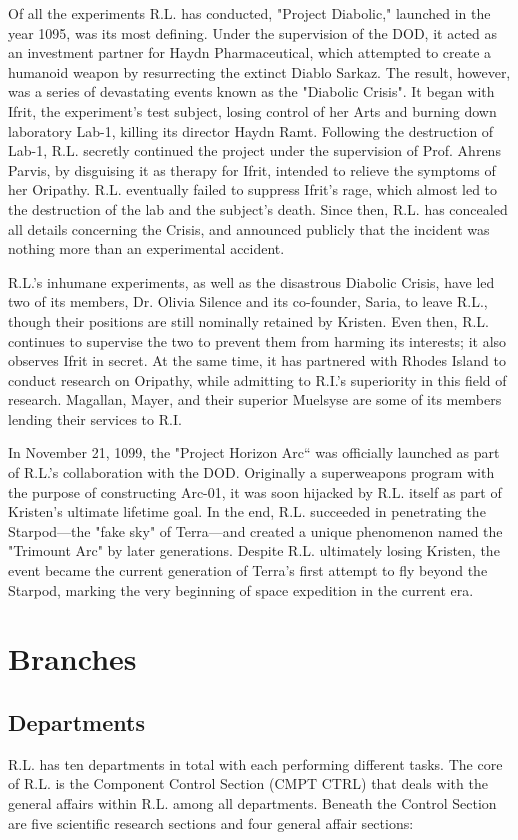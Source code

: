 \documentclass[12pt]{article}
\begin{document}
\begin{multicols}{2}
    Of all the experiments R.L. has conducted, "Project Diabolic," launched in the year 1095, was its most defining. Under the supervision of the DOD, it acted as an investment partner for Haydn Pharmaceutical, which attempted to create a humanoid weapon by resurrecting the extinct Diablo Sarkaz.\cite{4} The result, however, was a series of devastating events known as the "Diabolic Crisis". It began with Ifrit, the experiment's test subject, losing control of her Arts and burning down laboratory Lab-1, killing its director Haydn Ramt. Following the destruction of Lab-1, R.L. secretly continued the project under the supervision of Prof. Ahrens Parvis, by disguising it as therapy for Ifrit, intended to relieve the symptoms of her Oripathy. R.L. eventually failed to suppress Ifrit's rage, which almost led to the destruction of the lab and the subject's death.\cite{5} Since then, R.L. has concealed all details concerning the Crisis, and announced publicly that the incident was nothing more than an experimental accident. 

    R.L.'s inhumane experiments, as well as the disastrous Diabolic Crisis, have led two of its members, Dr. Olivia Silence and its co-founder, Saria, to leave R.L., though their positions are still nominally retained by Kristen. Even then, R.L. continues to supervise the two to prevent them from harming its interests; it also observes Ifrit in secret. At the same time, it has partnered with Rhodes Island to conduct research on Oripathy, while admitting to R.I.'s superiority in this field of research. Magallan, Mayer, and their superior Muelsyse are some of its members lending their services to R.I.

    In November 21, 1099, the "Project Horizon Arc“ was officially launched as part of R.L.'s collaboration with the DOD. Originally a superweapons program with the purpose of constructing Arc-01, it was soon hijacked by R.L. itself as part of Kristen's ultimate lifetime goal. In the end, R.L. succeeded in penetrating the Starpod—the "fake sky" of Terra—and created a unique phenomenon named the "Trimount Arc" by later generations. Despite R.L. ultimately losing Kristen, the event became the current generation of Terra's first attempt to fly beyond the Starpod, marking the very beginning of space expedition in the current era. 

\section{Branches}
\subsection{Departments}
    R.L. has ten departments in total with each performing different tasks. The core of R.L. is the Component Control Section (CMPT CTRL) that deals with the general affairs within R.L. among all departments. Beneath the Control Section are five scientific research sections and four general affair sections: 

\end{multicols}
\end{document}
